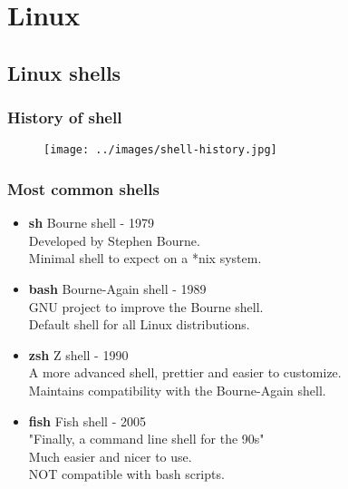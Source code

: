 



\begin{frame}
   \titlepage
\end{frame}

\begin{frame}
   \tableofcontents
\end{frame}

\section{Linux}

\subsection{Linux shells}

\begin{frame}
   \frametitle{History of shell}
   \begin{figure}
      \centering
      \texttt{[image: ../images/shell-history.jpg]}
   \end{figure}
\end{frame}

\begin{frame}
   \frametitle{Most common shells}
   \begin{itemize}
      \item {\bf sh} Bourne shell - 1979 \\
            Developed by Stephen Bourne. \\
            Minimal shell to expect on a *nix system.
      \item {\bf bash} Bourne-Again shell - 1989 \\
            GNU project to improve the Bourne shell. \\
            Default shell for all Linux distributions.
      \item {\bf zsh} Z shell - 1990 \\
            A more advanced shell, prettier and easier to customize. \\
            Maintains compatibility with the Bourne-Again shell.
      \item {\bf fish} Fish shell - 2005 \\
            "Finally, a command line shell for the 90s" \\
            Much easier and nicer to use. \\
            NOT compatible with bash scripts.
   \end{itemize}
\end{frame}

